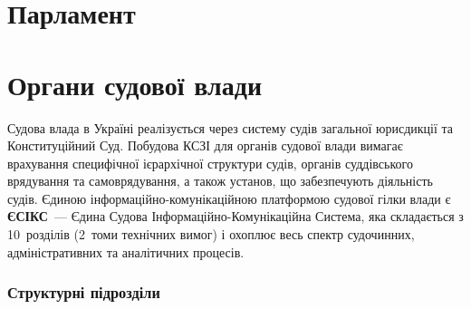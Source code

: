 \chapter{Парламент}

\chapter{Органи судової влади}

Судова влада в Україні реалізується через систему судів загальної юрисдикції та
Конституційний Суд. Побудова КСЗІ для органів судової влади вимагає врахування
специфічної ієрархічної структури судів, органів суддівського врядування та
самоврядування, а також установ, що забезпечують діяльність судів. Єдиною
інформаційно-комунікаційною платформою судової гілки влади є \textbf{ЄСІКС}~---
Єдина Судова Інформаційно-Комунікаційна Система, яка складається з 10~розділів
(2~томи технічних вимог) і охоплює весь спектр судочинних, адміністративних та
аналітичних процесів.

\newpage
\subsection*{Структурні підрозділи}

